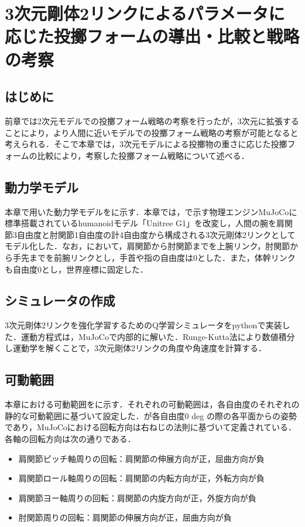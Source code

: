 
\chapter[3次元剛体2リンクによるパラメータに応じた投擲フォームの導出・比較と戦略の考察]{3次元剛体2リンクによるパラメータに応じた投擲フォームの導出・比較と戦略の考察}

\section{はじめに}
前章では2次元モデルでの投擲フォーム戦略の考察を行ったが，3次元に拡張することにより，より人間に近いモデルでの投擲フォーム戦略の考察が可能となると考えられる．そこで本章では，3次元モデルによる投擲物の重さに応じた投擲フォームの比較により，考察した投擲フォーム戦略について述べる．
\section{動力学モデル}
本章で用いた動力学モデルをに示す．本章では，で示す物理エンジンMuJoCo\cite{mujoco}\cite{mujoco2}に標準搭載されているhumanoidモデル「Unitree G1」\cite{unitreeg1}を改変し，人間の腕を肩関節3自由度と肘関節1自由度の計4自由度から構成される3次元剛体2リンクとしてモデル化した．なお，において，肩関節から肘関節までを上腕リンク，肘関節から手先までを前腕リンクとし，手首や指の自由度は0とした．また，体幹リンクも自由度0とし，世界座標に固定した．


\section{シミュレータの作成}
3次元剛体2リンクを強化学習するためのQ学習シミュレータをpythonで実装した．運動方程式は，MuJoCoで内部的に解いた．Runge-Kutta法により数値積分し運動学を解くことで，3次元剛体2リンクの角度や角速度を計算する．
\section{可動範囲}
本章における可動範囲をに示す．それぞれの可動範囲は，各自由度のそれぞれの静的な可動範囲\cite{range}に基づいて設定した．が各自由度0 deg の際の各平面からの姿勢であり，MuJoCoにおける回転方向は右ねじの法則に基づいて定義されている．各軸の回転方向は次の通りである．

\begin{itemize}
  \item 肩関節ピッチ軸周りの回転：肩関節の伸展方向が正，屈曲方向が負
  \item 肩関節ロール軸周りの回転：肩関節の内転方向が正，外転方向が負
  \item 肩関節ヨー軸周りの回転：肩関節の内旋方向が正，外旋方向が負
  \item 肘関節周りの回転：肩関節の伸展方向が正，屈曲方向が負
\end{itemize}

